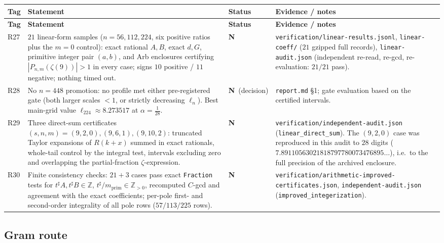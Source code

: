 \documentclass[11pt]{article}
\newcommand{\stN}{\textcolor{numblue}{\textbf{N}}}
\newcommand{\Z}{\mathbb{Z}}
\begin{document}
\begin{longtable}{@{}p{}p{}p{}p{}@{}}
\toprule \textbf{Tag} & \textbf{Statement} & \textbf{Status} & \textbf{Evidence / notes} \\ \midrule
\endfirsthead
\toprule \textbf{Tag} & \textbf{Statement} & \textbf{Status} & \textbf{Evidence / notes} \\ \midrule
\endhead
R27 & $21$ linear-form samples ($n=56,112,224$, six positive ratios plus the $m=0$ control): exact
      rational $A,B$, exact $d,G$, primitive integer pair $(a,b)$, and Arb enclosures certifying
      $|P_{n,m}(\zeta(9))|>1$ in every case; signs $10$ positive / $11$ negative; nothing timed out.
      & \stN & \texttt{verification/linear-results.jsonl}, \texttt{linear-coeff/} ($21$ gzipped full
      records), \texttt{linear-audit.json} (independent re-read, re-gcd, re-evaluation:
      $21/21$ pass). \\
R28 & No $n=448$ promotion: no profile met either pre-registered gate (both larger scales $<1$, or
      strictly decreasing $\ell_n$). Best main-grid value $\ell_{224}\approx8.273517$ at $\alpha=\tfrac1{28}$.
      & \stN\ (decision) & \texttt{report.md} \S1; gate evaluation based on the certified intervals. \\
R29 & Three direct-sum certificates $(s,n,m)=(9,2,0),(9,6,1),(9,10,2)$: truncated Taylor expansions of
      $R(k+x)$ summed in exact rationals, whole-tail control by the integral test, intervals excluding
      zero and overlapping the partial-fraction $\zeta$-expression. & \stN
      & \texttt{verification/independent-audit.json} (\texttt{linear\_direct\_sum}). The $(9,2,0)$ case
      was reproduced in this audit to $28$ digits ($7.89110563021818797780073476895\ldots$), i.e.\ to
      the full precision of the archived enclosure. \\
R30 & Finite consistency checks: $21+3$ cases pass exact \texttt{Fraction} tests for
      $t^{\sharp}A,t^{\sharp}B\in\Z$, $t^{\sharp}/m_{\mathrm{prim}}\in\Z_{>0}$, recomputed $C$-gcd and
      agreement with the exact coefficients; per-pole first- and second-order integrality of all pole
      rows ($57/113/225$ rows). & \stN & \texttt{verification/arithmetic-improved-certificates.json},
      \texttt{independent-audit.json} (\texttt{improved\_integerization}). \\
\bottomrule
\end{longtable}

\subsection{Gram route}
\end{document}
